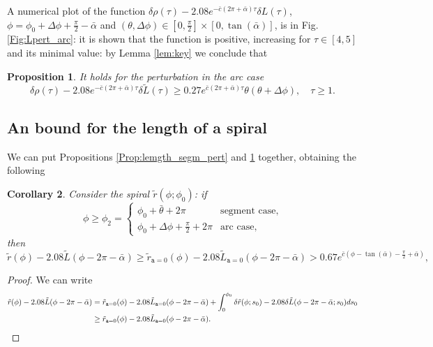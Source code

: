\documentclass[reqno]{amsart}
\theoremstyle{definition} \newtheorem{definition}{Definition}[section]
\theoremstyle{definition} \newtheorem{remark}[definition]{Remark}
\theoremstyle{plain} \newtheorem{lemma}[definition]{Lemma}
\theoremstyle{plain} \newtheorem{proposition}[definition]{Proposition}
\theoremstyle{plain} \newtheorem{theorem}[definition]{Theorem}
\theoremstyle{plain} \newtheorem{corollary}[definition]{Corollary}
\theoremstyle{definition} \newtheorem{example}[definition]{Example}
\theoremstyle{plain} \newtheorem{claim}[clai]{Claim}
\theoremstyle{definition} \newtheorem{assumption}[definition]{Assumption}
\theoremstyle{definition} \newtheorem{observation}[definition]{Observation}
\newcommand{\1}{\mathbbm 1}
\numberwithin{equation}{section} %
\theoremstyle{plain} \newtheorem*{theorem*}{Theorem}
\theoremstyle{plain} \newtheorem{mthm}[maintheorem]{Main Theorem}
\theoremstyle{plain} \newtheorem*{mthm*}{Main Theorem}
\theoremstyle{plain} \newtheorem*{conjecture*}{Conjecture}
\theoremstyle{plain} \newtheorem{conjecture}[definition]{Conjecture}
\theoremstyle{plain} \newtheorem*{problem*}{Problem}
\begin{document}
A numerical plot of the function $\delta \rho(\tau) - 2.08 e^{-\bar c (2\pi + \bar \alpha) \tau} \delta L(\tau)$, $\phi = \phi_0 + \Delta \phi + \frac{\pi}{2} - \bar \alpha$ and $(\theta,\Delta \phi) \in [0,\frac{\pi}{2}] \times [0,\tan(\bar \alpha)]$, is in Fig. \ref{Fig:Lpert_arc}: it is shown that the function is positive, increasing for $\tau \in [4,5]$ and its minimal value: by Lemma \ref{lem:key} we conclude that

\begin{proposition}
\label{Prop:lemgth_arc_pert}
It holds for the perturbation in the arc case
\begin{equation*}
\delta \rho(\tau) - 2.08 e^{-\bar c (2\pi + \bar \alpha) \tau} \delta \tilde L(\tau) \geq 0.27 e^{\bar c (2\pi + \bar \alpha) \tau} \theta(\theta + \Delta \phi), \quad \tau \geq 1.
\end{equation*}
\end{proposition}


\subsection{An bound for the length of a spiral}
\label{Ss:bound_lenth}


We can put Propositions \ref{Prop:lemgth_segm_pert} and \ref{Prop:lemgth_arc_pert} together, obtaining the following

\begin{corollary}
\label{Cor:bound_length_gen}
Consider the spiral $\tilde r(\phi;\phi_0)$: if
$$
\phi \geq \phi_2 = \begin{cases}
\phi_0 + \bar \theta + 2\pi & \text{segment case}, \\
\phi_0 + \Delta \phi + \frac{\pi}{2} + 2\pi & \text{arc case},
\end{cases}
$$
then
\begin{equation*}
\tilde r(\phi) - 2.08 \tilde L(\phi - 2\pi - \bar \alpha) \geq \tilde r_{\mathtt a = 0}(\phi) - 2.08 \tilde L_{\mathtt a = 0}(\phi - 2\pi - \bar \alpha) > 0.67 e^{\bar c(\phi - \tan(\bar \alpha) - \frac{\pi}{2} + \bar \alpha)},
\end{equation*}
\end{corollary}

\begin{proof}
We can write
\begin{align*}
\tilde r(\phi) - 2.08 \tilde L(\phi - 2\pi - \bar \alpha) &= \tilde r_{\mathtt a = 0}(\phi) - 2.08 \tilde L_{\mathtt a = 0}(\phi - 2\pi - \bar \alpha) + \int_0^{\phi_0} \delta \tilde r(\phi;s_0) - 2.08 \delta \tilde L(\phi - 2\pi - \bar \alpha;s_0) ds_0 \\
&\geq \tilde r_{\mathtt a = 0}(\phi) - 2.08 \tilde L_{\mathtt a = 0}(\phi - 2\pi - \bar \alpha). \qedhere
\end{align*}
\end{proof}
\end{document}
